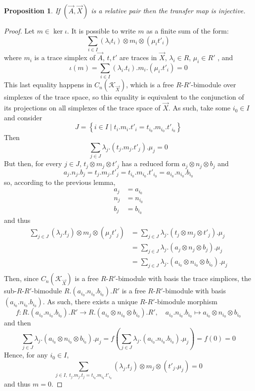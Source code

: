 \documentclass[a4paper,fleqn]{cas-sc}
\newtheorem{prop}[thm]{Proposition}%
\newcommand{\K}{\mathcal{K}}
\begin{document}





\begin{prop}
\label{prop:24}
If $(\Vec{A}, \Vec{X})$ is a relative pair then the transfer map is injective.
\end{prop}

\begin{proof}
Let $m \in \ker \iota$. It is possible to write $m$ as a finite sum of the form:
\[
\sum_{i \in I} (\lambda_i t_i) \otimes m_i \otimes (\mu_i t'_i)
\]
where $m_i$ is a trace simplex of $\Vec{A}$,  $t,t'$ are traces in $\Vec{X}$, $\lambda_i \in R$, $\mu_i \in R'$ , and
\[
\iota(m) = \sum_{i \in I} (\lambda_i .t_i). m_i . (\mu_i.t'_i) = 0
\]
This last equality happens in $C_n(\K_{\Vec{X}})$, which is a free $R$-$R'$-bimodule over simplexes of the trace space, so this equality is equivalent to the conjunction of its projections on all simplexes of the trace space of $\Vec{X}$. As such, take some $i_0 \in I$ and consider 
\[
J = \left\{i \in I \; | \; t_i.m_i.t'_i = t_{i_0}.m_{i_0}.t'_{i_0}\right\}
\]
Then 
\[
\sum_{j \in J} \lambda_j .(t_j. m_j . t'_j).\mu_j = 0
\]
But then, for every $j \in J$, $t_j \otimes m_j \otimes t'_j$ has a reduced form $a_j \otimes n_j \otimes b_j$ and
\[ a_j. n_j . b_j = t_j.m_j. t'_j 
= t_{i_0}.m_{i_0}.t'_{i_0} 
= a_{i_0}.n_{i_0}.b_{i_0} \]
\noindent so, according to the previous lemma, 
\begin{align*}
    a_j &= a_{i_0}\\
    n_j &= n_{i_0}\\
    b_j &= b_{i_0}
\end{align*}
\noindent and thus 
\begin{align*}
\sum_{j \in J} (\lambda_j .t_j) \otimes m_j \otimes  (\mu_j t'_j)
&= \sum_{j \in J} \lambda_j .(t_j \otimes m_j \otimes t'_j).\mu_j \\
&= \sum_{j \in J} \lambda_j .(a_j \otimes n_j \otimes b_j ). \mu_j\\
&= \sum_{j \in J} \lambda_j .(a_{i_0} \otimes n_{i_0} \otimes b_{i_0} ). \mu_j\\
\end{align*}
Then, since $C_n(\K_{\Vec{X}})$ is a free $R$-$R'$-bimodule with basis the trace simplices, the sub-$R$-$R'$-bimodule $R.(a_{i_0}.n_{i_0}.b_{i_0}).R'$ is a free $R$-$R'$-bimodule with basis $(a_{i_0}.n_{i_0}.b_{i_0})$. As such, there exists a unique $R$-$R'$-bimodule morphism 
\[f: 
R.(a_{i_0}.n_{i_0}.b_{i_0}).R' \to R.(a_{i_0} \otimes n_{i_0} \otimes b_{i_0} ).R', \quad
a_{i_0}.n_{i_0}.b_{i_0}\mapsto a_{i_0} \otimes n_{i_0} \otimes b_{i_0}
\]
\noindent and then
\[
\sum_{j \in J} \lambda_j .(a_{i_0} \otimes n_{i_0} \otimes b_{i_0} ). \mu_j 
= 
f\left( \sum_{j \in J} \lambda_j .(a_{i_0} . n_{i_0} . b_{i_0} ). \mu_j \right) = f(0) = 0
\]
Hence, for any $i_0 \in I$,
\[\sum_{j \in I, \; t_j.m_j.t_j = t_{i_0}.m_{i_0}.t'_{i_0}} (\lambda_j .t_j) \otimes m_j \otimes (t'_j . \mu_j ) = 0\]
and thus $m = 0$.
\end{proof}
\end{document}
